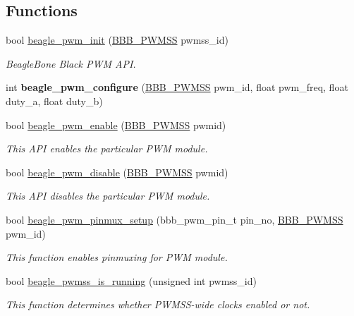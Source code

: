 \subsection*{Functions}
\begin{DoxyCompactItemize}
\item 
bool \mbox{\hyperlink{bbb-pwm_8h_a51cabf390acb95808980e8bfbca7c7f9}{beagle\+\_\+pwm\+\_\+init}} (\mbox{\hyperlink{bbb-pwm_8h_a8e1f51037d4bbe9c36217634f75a628e}{B\+B\+B\+\_\+\+P\+W\+M\+SS}} pwmss\+\_\+id)
\begin{DoxyCompactList}\small\item\em Beagle\+Bone Black P\+WM A\+PI. \end{DoxyCompactList}\item 
\mbox{\label{bbb-pwm_8h_a26613423e44d7b38480ac9965a58fe5d}} 
int {\bfseries beagle\+\_\+pwm\+\_\+configure} (\mbox{\hyperlink{bbb-pwm_8h_a8e1f51037d4bbe9c36217634f75a628e}{B\+B\+B\+\_\+\+P\+W\+M\+SS}} pwm\+\_\+id, float pwm\+\_\+freq, float duty\+\_\+a, float duty\+\_\+b)
\item 
bool \mbox{\hyperlink{bbb-pwm_8h_a0a1b5e73110b79efb7cee71b7d681b98}{beagle\+\_\+pwm\+\_\+enable}} (\mbox{\hyperlink{bbb-pwm_8h_a8e1f51037d4bbe9c36217634f75a628e}{B\+B\+B\+\_\+\+P\+W\+M\+SS}} pwmid)
\begin{DoxyCompactList}\small\item\em This A\+PI enables the particular P\+WM module. \end{DoxyCompactList}\item 
bool \mbox{\hyperlink{bbb-pwm_8h_a04c3bc9942822930b25a1882f14e02ef}{beagle\+\_\+pwm\+\_\+disable}} (\mbox{\hyperlink{bbb-pwm_8h_a8e1f51037d4bbe9c36217634f75a628e}{B\+B\+B\+\_\+\+P\+W\+M\+SS}} pwmid)
\begin{DoxyCompactList}\small\item\em This A\+PI disables the particular P\+WM module. \end{DoxyCompactList}\item 
bool \mbox{\hyperlink{bbb-pwm_8h_aa05074bca0f1e56aac74b846d71c7133}{beagle\+\_\+pwm\+\_\+pinmux\+\_\+setup}} (bbb\+\_\+pwm\+\_\+pin\+\_\+t pin\+\_\+no, \mbox{\hyperlink{bbb-pwm_8h_a8e1f51037d4bbe9c36217634f75a628e}{B\+B\+B\+\_\+\+P\+W\+M\+SS}} pwm\+\_\+id)
\begin{DoxyCompactList}\small\item\em This function enables pinmuxing for P\+WM module. \end{DoxyCompactList}\item 
bool \mbox{\hyperlink{bbb-pwm_8h_a271bcad80c7a9b5188e50d88182b1b7d}{beagle\+\_\+pwmss\+\_\+is\+\_\+running}} (unsigned int pwmss\+\_\+id)
\begin{DoxyCompactList}\small\item\em This function determines whether P\+W\+M\+S\+S-\/wide clocks enabled or not. \end{DoxyCompactList}\end{DoxyCompactItemize}


